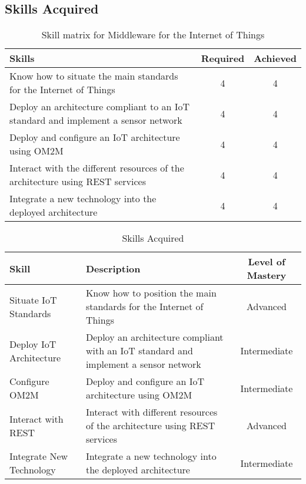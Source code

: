 \subsection{Skills Acquired}

\begin{table}[h!]
    \centering
    \renewcommand{\arraystretch}{1.5} %
    \begin{tabular}{|p{11cm}|c|c|}
    \hline
    \rowcolor[gray]{0.8}
    \textbf{Skills} & \textbf{Required} & \textbf{Achieved} \\ \hline
    Know how to situate the main standards for the Internet of Things & 4 & 4 \\ \hline
    Deploy an architecture compliant to an IoT standard and implement a sensor network & 4 & 4 \\ \hline
    Deploy and configure an IoT architecture using OM2M & 4 & 4 \\ \hline
    Interact with the different resources of the architecture using REST services & 4 & 4 \\ \hline
    Integrate a new technology into the deployed architecture & 4 & 4 \\ \hline
    \end{tabular}
    \caption{Skill matrix for Middleware for the Internet of Things}
    \label{table:skills-middleware-iot}
\end{table}

\begin{table}[H]
    \centering
    \renewcommand{\arraystretch}{1.5} %
    \begin{tabular}{|>{\raggedright}p{3.5cm}|p{8cm}|c|}
    \hline
    \rowcolor[gray]{0.8}
    \textbf{Skill} & \textbf{Description} & \textbf{Level of Mastery} \\
    \hline
    Situate IoT Standards & Know how to position the main standards for the Internet of Things & Advanced \\
    \hline
    Deploy IoT Architecture & Deploy an architecture compliant with an IoT standard and implement a sensor network & Intermediate \\
    \hline
    Configure OM2M & Deploy and configure an IoT architecture using OM2M & Intermediate \\
    \hline
    Interact with REST & Interact with different resources of the architecture using REST services & Advanced \\
    \hline
    Integrate New Technology & Integrate a new technology into the deployed architecture & Intermediate \\
    \hline
    \end{tabular}
    \caption{Skills Acquired}
    \label{tab:skills_acquired}
\end{table}

